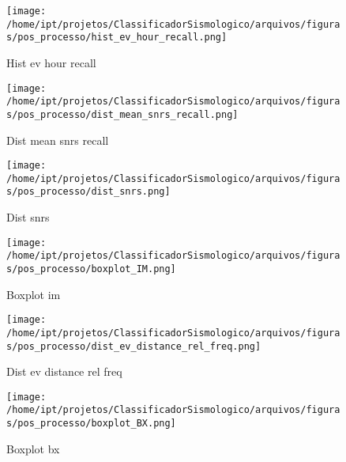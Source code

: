 
                    \begin{figure}[H]
                        \centering
                        \texttt{[image: /home/ipt/projetos/ClassificadorSismologico/arquivos/figuras/pos\_processo/hist\_ev\_hour\_recall.png]}
                        \caption{Hist ev hour recall}
                        \label{fig:hist_ev_hour_recall}
                    \end{figure}
                

                    \begin{figure}[H]
                        \centering
                        \texttt{[image: /home/ipt/projetos/ClassificadorSismologico/arquivos/figuras/pos\_processo/dist\_mean\_snrs\_recall.png]}
                        \caption{Dist mean snrs recall}
                        \label{fig:dist_mean_snrs_recall}
                    \end{figure}
                

                    \begin{figure}[H]
                        \centering
                        \texttt{[image: /home/ipt/projetos/ClassificadorSismologico/arquivos/figuras/pos\_processo/dist\_snrs.png]}
                        \caption{Dist snrs}
                        \label{fig:dist_snrs}
                    \end{figure}
                

                    \begin{figure}[H]
                        \centering
                        \texttt{[image: /home/ipt/projetos/ClassificadorSismologico/arquivos/figuras/pos\_processo/boxplot\_IM.png]}
                        \caption{Boxplot im}
                        \label{fig:boxplot_IM}
                    \end{figure}
                

                    \begin{figure}[H]
                        \centering
                        \texttt{[image: /home/ipt/projetos/ClassificadorSismologico/arquivos/figuras/pos\_processo/dist\_ev\_distance\_rel\_freq.png]}
                        \caption{Dist ev distance rel freq}
                        \label{fig:dist_ev_distance_rel_freq}
                    \end{figure}
                

                    \begin{figure}[H]
                        \centering
                        \texttt{[image: /home/ipt/projetos/ClassificadorSismologico/arquivos/figuras/pos\_processo/boxplot\_BX.png]}
                        \caption{Boxplot bx}
                        \label{fig:boxplot_BX}
                    \end{figure}
                

